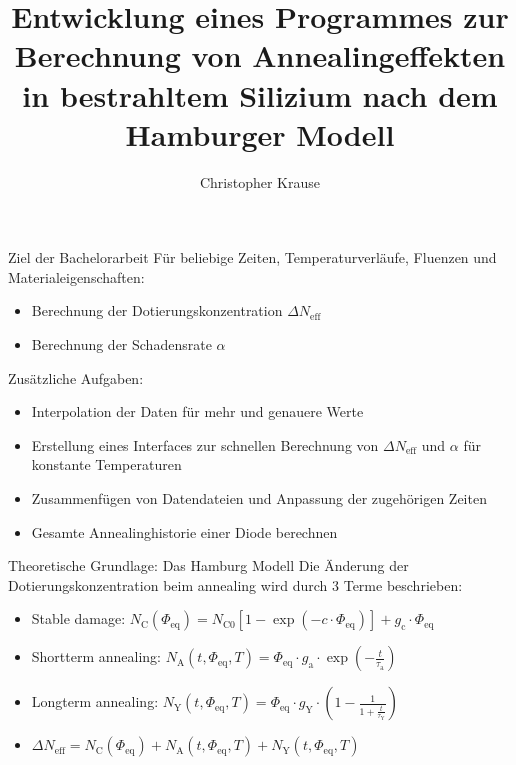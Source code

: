 \documentclass[aspectratio=1610, 9pt]{beamer}
\title{Entwicklung eines Programmes zur Berechnung von Annealingeffekten in bestrahltem Silizium nach dem Hamburger Modell}
\author[C.~Krause]{Christopher Krause}
\institute[E4]{Experimentelle Physik \\ Fakultät Physik}
\begin{document}
\maketitle

\begin{frame}{Ziel der Bachelorarbeit}
  Für beliebige Zeiten, Temperaturverläufe, Fluenzen und Materialeigenschaften:
  \begin{itemize}
    \item Berechnung der Dotierungskonzentration $\Delta N_{\mathrm{eff}}$
    \item Berechnung der Schadensrate $\alpha$
  \end{itemize}
  \medskip

  Zusätzliche Aufgaben:
  \begin{itemize}
    \item Interpolation der Daten für mehr und genauere Werte
    \item Erstellung eines Interfaces zur schnellen Berechnung von $\Delta N_{\mathrm{eff}}$ und $\alpha$
    für konstante Temperaturen
    \item Zusammenfügen von Datendateien und Anpassung der zugehörigen Zeiten
    \item Gesamte Annealinghistorie einer Diode berechnen
  \end{itemize}
\end{frame}


\begin{frame}{Theoretische Grundlage: Das Hamburg Modell}
  Die Änderung der Dotierungskonzentration beim annealing wird durch 3 Terme beschrieben:
  \medskip
  \begin{itemize}
    \item Stable damage:\: $N_{\mathrm{C}}(\Phi_{\mathrm{eq}}) = N_{\mathrm{C0}}[1-\exp{(-c \cdot \Phi_{\mathrm{eq}})}] + g_{\mathrm{c}} \cdot \Phi_{\mathrm{eq}}$
    \medskip
    \item Shortterm annealing:\: $N_{\mathrm{A}}(t, \Phi_{\mathrm{eq}}, T)= \Phi_{\mathrm{eq}} \cdot g_{\mathrm{a}} \cdot \exp{(-\frac{t}{\tau_{\mathrm{a}}})}$
    \medskip
    \item Longterm annealing:\: $N_{\mathrm{Y}}(t, \Phi_{\mathrm{eq}}, T)= \Phi_{\mathrm{eq}} \cdot g_{\mathrm{Y}} \cdot \left(1-\frac{1}{1+\frac{t}{\tau_{\mathrm{Y}}}}\right)$
    \medskip
    \item   $\Delta N_{\mathrm{eff}} = N_{\mathrm{C}}(\Phi_{\mathrm{eq}}) + N_{\mathrm{A}}(t, \Phi_{\mathrm{eq}}, T) + N_{\mathrm{Y}}(t, \Phi_{\mathrm{eq}}, T)$
  \end{itemize}
\end{frame}
\end{document}
